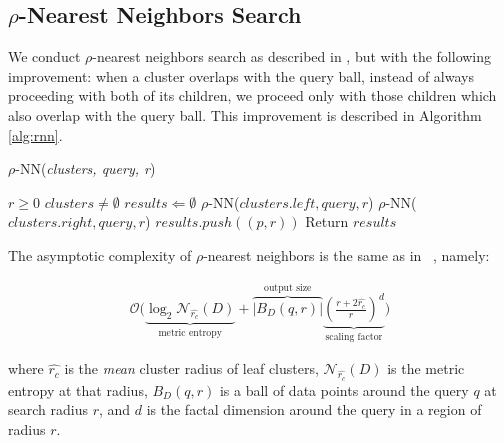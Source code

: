 \subsection{\texorpdfstring{$\rho$}{p}-Nearest Neighbors Search}
\label{subsec:methods:rnn-search}

We conduct $\rho$-nearest neighbors search as described in \cite{ishaq2019clustered}, but 
with the following improvement: when a cluster overlaps with the query ball, instead of  
always proceeding with both of its children, we proceed only with those children which 
also overlap with the query ball. This improvement is described in Algorithm \ref{alg:rnn}.

\begin{algorithm} 
    \caption{$\rho$-NN(\emph{clusters, query, r})} 
    \label{alg:rnn} 
    \begin{algorithmic}
        \REQUIRE $r \geq 0$
        \REQUIRE $clusters \neq \emptyset$
        \STATE $results \Leftarrow \emptyset$
                \STATE $\rho$-NN($clusters.left, query, r$)
            \ENDIF
        \ENDIF
                \STATE $\rho$-NN($clusters.right, query, r$)
            \ENDIF
        \ENDIF
                    \STATE $results.push((p, r))$
                \ENDIF
            \ENDFOR
        \ENDIF
        \STATE Return $results$
    \end{algorithmic}
    \end{algorithm}


The asymptotic complexity of $\rho$-nearest neighbors is the same as in ~\cite{ishaq2019clustered}, namely:

\begin{gather}
    \mathcal{O}\Bigg(
    \underbrace{\log_2 \mathcal{N}_{\hat{r_c}}(D)}_{\textrm{metric entropy}} +
    \overbrace{\left|B_D(q,r)\right|}^{\textrm{output size}}
    \underbrace{\left(\frac{r+2\hat{r_c}}{r}\right)^d}_{\textrm{scaling factor}}
     \Bigg)
     \label{hierarchical-complexity}
\end{gather}

where $\hat{r_c}$ is the \textit{mean} cluster radius of leaf clusters, $\mathcal{N}_{\hat{r_c}}(D)$ is the metric entropy at that radius, $B_D(q,r)$ is a ball of data points around the query $q$ at search radius $r$, and $d$ is the factal dimension around the query in a region of radius $r$.

